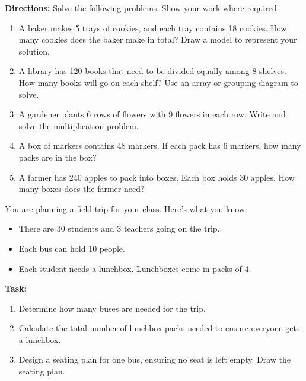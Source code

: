 \documentclass[12pt]{article}
\begin{document}
\vspace{1em}

\begin{tcolorbox}[colframe=black!60, colback=white, 
coltitle=black, colbacktitle=black!15, fonttitle=\bfseries\Large, 
title=Problems, halign title=center, left=10pt, right=10pt, top=10pt, bottom=60pt]
\textbf{Directions:} Solve the following problems. Show your work where required.

\begin{enumerate}[start=9, itemsep=7em]
    \item A baker makes 5 trays of cookies, and each tray contains 18 cookies. How many cookies does the baker make in total? Draw a model to represent your solution.
    \item A library has 120 books that need to be divided equally among 8 shelves. How many books will go on each shelf? Use an array or grouping diagram to solve.
    \item A gardener plants 6 rows of flowers with 9 flowers in each row. Write and solve the multiplication problem.
    \item A box of markers contains 48 markers. If each pack has 6 markers, how many packs are in the box?
    \item A farmer has 240 apples to pack into boxes. Each box holds 30 apples. How many boxes does the farmer need?
  
\end{enumerate}
\end{tcolorbox}

\vspace{1em}

\begin{tcolorbox}[colframe=black!60, colback=white, 
coltitle=black, colbacktitle=black!15, fonttitle=\bfseries\Large, 
title=Performance Task: Planning a Field Trip, halign title=center, left=10pt, right=10pt, top=10pt, bottom=50pt]
You are planning a field trip for your class. Here’s what you know:
\begin{itemize}
    \item There are 30 students and 3 teachers going on the trip.
    \item Each bus can hold 10 people.
    \item Each student needs a lunchbox. Lunchboxes come in packs of 4.
\end{itemize}
\textbf{Task:}
\begin{enumerate}[itemsep=5em]
    \item Determine how many buses are needed for the trip.
    \item Calculate the total number of lunchbox packs needed to ensure everyone gets a lunchbox.
  
    \item Design a seating plan for one bus, ensuring no seat is left empty. Draw the seating plan.
\end{enumerate}
\vspace{5em}
\end{tcolorbox}
\end{document}
